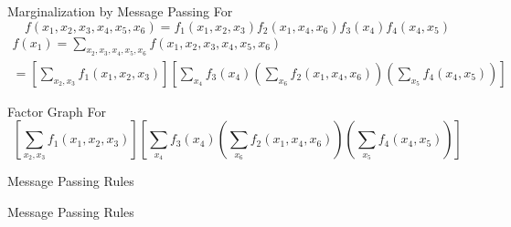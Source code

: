 \documentclass{beamer}
\begin{document}
  \begin{frame}{Marginalization by Message Passing}
    For
    \begin{equation*}
      f(x_1,x_2,x_3,x_4,x_5,x_6) = f_1(x_1,x_2,x_3)f_2(x_1,x_4,x_6)f_3(x_4)f_4(x_4, x_5) \label{eq:fx}
    \end{equation*}
    \begin{eqnarray}
      f(x_1) 	=\sum_{x_2, x_3, x_4, x_5, x_6} f(x_1,x_2,x_3,x_4,x_5,x_6) \nonumber \\
	=\left[\sum_{x_2, x_3} f_1(x_1, x_2, x_3)\right]\left[\sum_{x_4}f_3(x_4)\left(\sum_{x_6}f_2(x_1, x_4, x_6)\right)\left(\sum_{x_5}f_4(x_4, x_5)\right)\right] \nonumber
    \end{eqnarray}
  \end{frame}
  
  \begin{frame}{Factor Graph}
      For
    \begin{equation*}
  \left[\sum_{x_2, x_3} f_1(x_1, x_2, x_3)\right]\left[\sum_{x_4}f_3(x_4)\left(\sum_{x_6}f_2(x_1, x_4, x_6)\right)\left(\sum_{x_5}f_4(x_4, x_5)\right)\right]
    \end{equation*}
   \begin{figure}[scale=0.7]
  \begin{center}
  
  \end{center}
  \end{figure}
  \end{frame}
  
  \begin{frame}{Message Passing Rules}
   \begin{figure}
  \begin{center}
  
  \end{center}
  \end{figure}
  \end{frame}
  
  \begin{frame}{Message Passing Rules}
   \begin{figure}
  \begin{center}
  
  \end{center}
  \end{figure}
  \end{frame}
  
\end{document}
